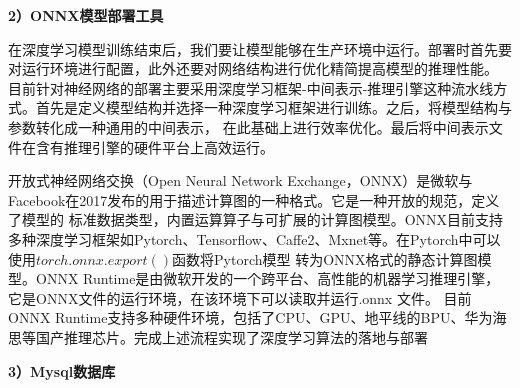 \textbf{2）ONNX模型部署工具}

在深度学习模型训练结束后，我们要让模型能够在生产环境中运行。部署时首先要对运行环境进行配置，此外还要对网络结构进行优化精简提高模型的推理性能。
目前针对神经网络的部署主要采用深度学习框架-中间表示-推理引擎这种流水线方式。首先是定义模型结构并选择一种深度学习框架进行训练。之后，将模型结构与参数转化成一种通用的中间表示，
在此基础上进行效率优化。最后将中间表示文件在含有推理引擎的硬件平台上高效运行。

开放式神经网络交换（Open Neural Network Exchange，ONNX）是微软与Facebook在2017发布的用于描述计算图的一种格式。它是一种开放的规范，定义了模型的
标准数据类型，内置运算算子与可扩展的计算图模型。ONNX目前支持多种深度学习框架如Pytorch、Tensorflow、Caffe2、Mxnet等。在Pytorch中可以使用$torch.onnx.export()$函数将Pytorch模型
转为ONNX格式的静态计算图模型。ONNX Runtime是由微软开发的一个跨平台、高性能的机器学习推理引擎，它是ONNX文件的运行环境，在该环境下可以读取并运行.onnx 文件。
目前ONNX Runtime支持多种硬件环境，包括了CPU、GPU、地平线的BPU、华为海思等国产推理芯片。完成上述流程实现了深度学习算法的落地与部署

\textbf{3）Mysql数据库}